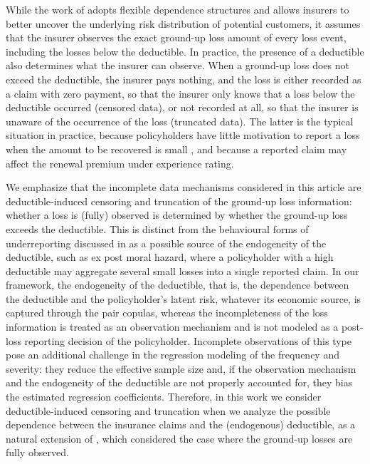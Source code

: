 \documentclass[11pt]{article}
\newcommand{\rev}[1]{{\color{blue}#1}}
\begin{document}
\rev{While the work of \citet{shi2022copula} adopts flexible dependence structures and allows insurers to better uncover the underlying risk distribution of potential customers, it assumes that the insurer observes the exact ground-up loss amount of every loss event, including the losses below the deductible. In practice, the presence of a deductible also determines what the insurer can observe. When a ground-up loss does not exceed the deductible, the insurer pays nothing, and the loss is either recorded as a claim with zero payment, so that the insurer only knows that a loss below the deductible occurred (censored data), or not recorded at all, so that the insurer is unaware of the occurrence of the loss (truncated data). The latter is the typical situation in practice, because policyholders have little motivation to report a loss when the amount to be recovered is small \citep{YipKarenC.H.2005Omcf}, and because a reported claim may affect the renewal premium under experience rating.

We emphasize that the incomplete data mechanisms considered in this article are deductible-induced censoring and truncation of the ground-up loss information: whether a loss is (fully) observed is determined by whether the ground-up loss exceeds the deductible. This is distinct from the behavioural forms of underreporting discussed in \citet{shi2022copula} as a possible source of the endogeneity of the deductible, such as ex post moral hazard, where a policyholder with a high deductible may aggregate several small losses into a single reported claim. In our framework, the endogeneity of the deductible, that is, the dependence between the deductible and the policyholder's latent risk, whatever its economic source, is captured through the pair copulas, whereas the incompleteness of the loss information is treated as an observation mechanism and is not modeled as a post-loss reporting decision of the policyholder. Incomplete observations of this type pose an additional challenge in the regression modeling of the frequency and severity: they reduce the effective sample size and, if the observation mechanism and the endogeneity of the deductible are not properly accounted for, they bias the estimated regression coefficients. Therefore, in this work we consider deductible-induced censoring and truncation when we analyze the possible dependence between the insurance claims and the (endogenous) deductible, as a natural extension of \citet{shi2022copula}, which considered the case where the ground-up losses are fully observed.}
\end{document}
